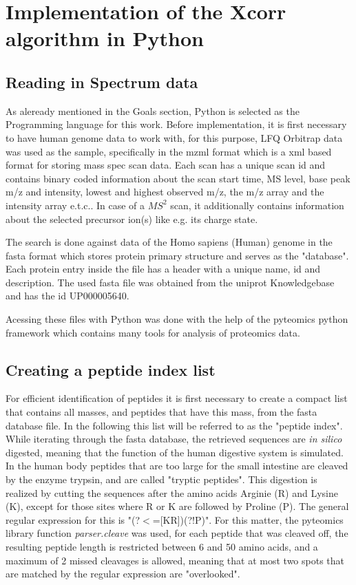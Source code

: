 \documentclass[11pt]{article}
\begin{document}
\section{Implementation of the Xcorr algorithm in Python}
\subsection{Reading in Spectrum data}

As aleready mentioned in the Goals section, Python is selected as the Programming language for this work. Before implementation, it is first necessary to have human genome data to work with, for this purpose, LFQ Orbitrap data was used as the sample, specifically in the mzml format which is a xml based format for storing mass spec scan data. Each scan has a unique scan id and contains binary coded information about the scan start time, MS level, base peak m/z and intensity, lowest and highest observed m/z, the m/z array and the intensity array e.t.c.. In case of a \(MS^2\) scan, it additionally contains information about the selected precursor ion(s) like e.g. its charge state.

The search is done against data of the Homo sapiens (Human) genome in the fasta format which stores protein primary structure and serves as the "database". Each protein entry inside the file has a header with a unique name, id and description. The used fasta file was obtained from the uniprot Knowledgebase and has the id UP000005640.

Acessing these files with Python was done with the help of the pyteomics python framework \cite{pyteomics, pyteomics-five-years} which contains many tools for analysis of proteomics data. 

\subsection{Creating a peptide index list}
For efficient identification of peptides it is first necessary to create a compact list that contains all masses, and peptides that have this mass, from the fasta database file. In the following this list will be referred to as the "peptide index". While iterating through the fasta database, the retrieved sequences are \textit{in silico} digested, meaning that the function of the human digestive system is simulated. In the human body peptides that are too large for the small intestine are cleaved by the enzyme trypsin, and are called "tryptic peptides". This digestion is realized by cutting the sequences after the amino acids Arginie (R) and Lysine (K), except for those sites where R or K are followed by Proline (P). The general regular expression for this is "(?$<$=[KR])(?!P)". For this matter, the pyteomics library function \textit{parser.cleave} was used, for each peptide that was cleaved off, the resulting peptide length is restricted between 6 and 50 amino acids, and a maximum of 2 missed cleavages is allowed, meaning that at most two spots that are matched by the regular expression are "overlooked". 
\end{document}

